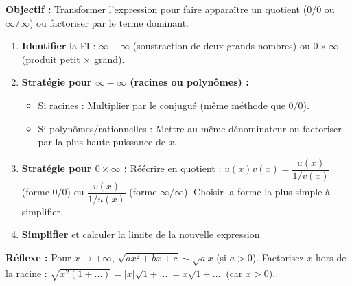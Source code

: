 \documentclass[11pt]{article}
\begin{document}
\begin{methode}
    \textbf{Objectif :} Transformer l'expression pour faire apparaître un quotient ($0/0$ ou $\infty/\infty$) ou factoriser par le terme dominant.
    \begin{enumerate}
        \item \textbf{Identifier} la FI : $\infty - \infty$ (soustraction de deux grands nombres) ou $0 \times \infty$ (produit petit $\times$ grand).
        \item \textbf{Stratégie pour $\infty - \infty$ (racines ou polynômes) :}
              \begin{itemize}
                  \item Si racines : Multiplier par le conjugué (même méthode que $0/0$).
                  \item Si polynômes/rationnelles : Mettre au même dénominateur ou factoriser par la plus haute puissance de $x$.
              \end{itemize}
        \item \textbf{Stratégie pour $0 \times \infty$ :} Réécrire en quotient : $u(x)v(x) = \dfrac{u(x)}{1/v(x)}$ (forme $0/0$) ou $\dfrac{v(x)}{1/u(x)}$ (forme $\infty/\infty$). Choisir la forme la plus simple à simplifier.
        \item \textbf{Simplifier} et calculer la limite de la nouvelle expression.
    \end{enumerate}
    \textbf{Réflexe :} Pour $x\to +\infty$, $\sqrt{ax^2+bx+c} \sim \sqrt{a}x$ (si $a>0$). Factorisez $x$ hors de la racine : $\sqrt{x^2(1+\dots)} = |x|\sqrt{1+\dots} = x\sqrt{1+\dots}$ (car $x>0$).
\end{methode}
\end{document}
